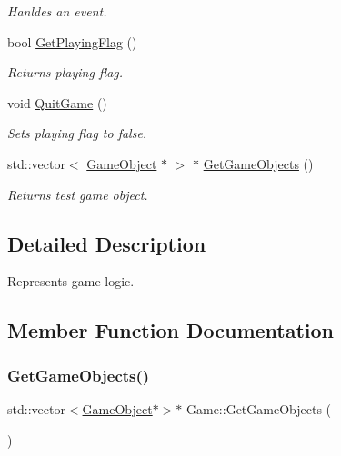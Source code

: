 \begin{DoxyCompactItemize}
\begin{DoxyCompactList}\small\item\em Hanldes an event. \end{DoxyCompactList}\item 
\mbox{\label{class_game_a00a6ce87351c9bc799834b0061396bbd}} 
bool \mbox{\hyperlink{class_game_a00a6ce87351c9bc799834b0061396bbd}{Get\+Playing\+Flag}} ()
\begin{DoxyCompactList}\small\item\em Returns playing flag. \end{DoxyCompactList}\item 
\mbox{\label{class_game_a69ee850fc9c3af5373a60ea26c2e6700}} 
void \mbox{\hyperlink{class_game_a69ee850fc9c3af5373a60ea26c2e6700}{Quit\+Game}} ()
\begin{DoxyCompactList}\small\item\em Sets playing flag to false. \end{DoxyCompactList}\item 
std\+::vector$<$ \mbox{\hyperlink{class_game_object}{Game\+Object}} $\ast$ $>$ $\ast$ \mbox{\hyperlink{class_game_af132c9a360c2adafd158c3a331b39c4d}{Get\+Game\+Objects}} ()
\begin{DoxyCompactList}\small\item\em Returns test game object. \end{DoxyCompactList}\end{DoxyCompactItemize}


\subsection{Detailed Description}
Represents game logic. 

\subsection{Member Function Documentation}
\mbox{\label{class_game_af132c9a360c2adafd158c3a331b39c4d}} 
\subsubsection{\texorpdfstring{Get\+Game\+Objects()}{GetGameObjects()}}
{\footnotesize\ttfamily std\+::vector$<$\mbox{\hyperlink{class_game_object}{Game\+Object}}$\ast$$>$$\ast$ Game\+::\+Get\+Game\+Objects (\begin{DoxyParamCaption}{ }\end{DoxyParamCaption})\hspace{0.3cm}{\ttfamily [inline]}}



